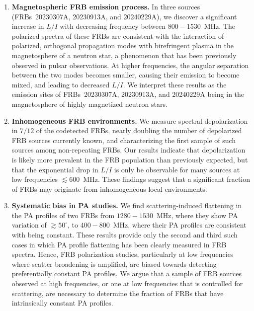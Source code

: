 \documentclass[twocolumn, linenumbers]{aastex701}
\begin{document}
\begin{enumerate}
    \item \textbf{Magnetospheric FRB emission process.} In three sources (FRBs~20230307A, 20230913A, and 20240229A), we discover a significant increase in $L/I$ with decreasing frequency between $800-1530$~MHz. The polarized spectra of these FRBs are consistent with the interaction of polarized, orthogonal propagation modes with birefringent plasma in the magnetosphere of a neutron star, a phenomenon that has been previously observed in pulsar observations. At higher frequencies, the angular separation between the two modes becomes smaller, causing their emission to become mixed, and leading to decreased $L/I$. We interpret these results as the emission sites of FRBs~20230307A, 20230913A, and 20240229A being in the magnetosphere of highly magnetized neutron stars.
    \item \textbf{Inhomogeneous FRB environments.} We measure spectral depolarization in $7/12$ of the codetected FRBs, nearly doubling the number of depolarized FRB sources currently known, and characterizing the first sample of such sources among non-repeating FRBs. Our results indicate that depolarization is likely more prevalent in the FRB population than previously expected, but that the exponential drop in $L/I$ is only be observable for many sources at low frequencies $\lesssim 600$~MHz. These findings suggest that a significant fraction of FRBs may originate from inhomogeneous local environments.
    \item \textbf{Systematic bias in PA studies.} We find scattering-induced flattening in the PA profiles of two FRBs from $1280-1530$~MHz, where they show PA variation of $\gtrsim 50^\circ$, to $400-800$~MHz, where their PA profiles are consistent with being constant. These results provide only the second and third such cases in which PA profile flattening has been clearly measured in FRB spectra. Hence, FRB polarization studies, particularly at low frequencies where scatter broadening is amplified, are biased towards detecting preferentially constant PA profiles. We argue that a sample of FRB sources observed at high frequencies, or one at low frequencies that is controlled for scattering, are necessary to determine the fraction of FRBs that have intrinsically constant PA profiles.
\end{enumerate}
\end{document}
